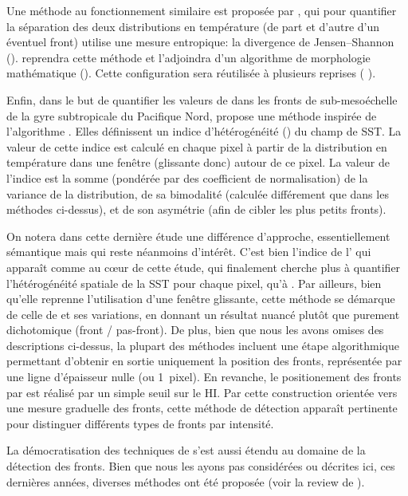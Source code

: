 Une méthode au fonctionnement similaire est proposée par \textcite{vazquez_1999}, qui pour quantifier la séparation des deux distributions en température (de part et d'autre d'un éventuel front) utilise une mesure entropique: la divergence de Jensen--Shannon (\cite{barranco-lopez_1995}).
\textcite{shimada_2005} reprendra cette méthode et l'adjoindra d'un algorithme de morphologie mathématique (\cite{jiang_1997}).
Cette configuration sera réutilisée à plusieurs reprises (\cite{lan_2012} ).

Enfin, dans le but de quantifier les valeurs de  dans les fronts de sub-mesoéchelle de la gyre subtropicale du Pacifique Nord, \textcite{liu_2016} propose une méthode inspirée de l'algorithme .
Elles définissent un indice d'hétérogénéité () du champ de SST.
La valeur de cette indice est calculé en chaque pixel à partir de la distribution en température dans une fenêtre (glissante donc) autour de ce pixel.
La valeur de l'indice est la somme (pondérée par des coefficient de normalisation) de la variance de la distribution, de sa bimodalité (calculée différement que dans les méthodes ci-dessus), et de son asymétrie (afin de cibler les plus petits fronts).

On notera dans cette dernière étude une différence d'approche, essentiellement sémantique mais qui reste néanmoins d'intérêt.
C'est bien l'indice de l' qui apparaît comme au cœur de cette étude, qui finalement cherche plus à quantifier l'hétérogénéité spatiale de la SST pour chaque pixel, qu'à .
Par ailleurs, bien qu'elle reprenne l'utilisation d'une fenêtre glissante, cette méthode se démarque de celle de  et ses variations, en donnant un résultat nuancé plutôt que purement dichotomique (front / pas-front).
De plus, bien que nous les avons omises des descriptions ci-dessus, la plupart des méthodes incluent une étape algorithmique permettant d'obtenir en sortie uniquement la position des fronts, représentée par une ligne d'épaisseur nulle (ou 1~pixel).
En revanche, le positionement des fronts par \citeauthor{liu_2016} est réalisé par un simple\footnotemark{} seuil sur le HI.
Par cette construction orientée vers une mesure graduelle des fronts, cette méthode de détection apparaît pertinente pour distinguer différents types de fronts par intensité.

\begin{note}
  La démocratisation des techniques de  s'est aussi étendu au domaine de la détection des fronts.
  Bien que nous les ayons pas considérées ou décrites ici, ces dernières années, diverses méthodes ont été proposée (voir la review de \cite{liu_2022}).
\end{note}

